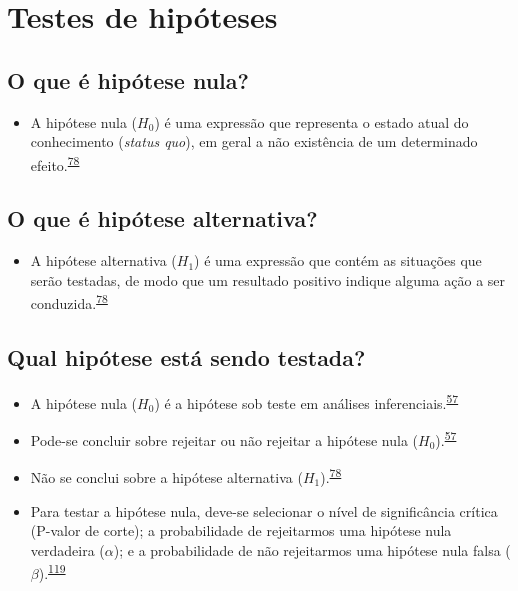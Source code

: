 \documentclass[
  a4paper,
]{book}
\providecommand{\tightlist}{%
  \setlength{\itemsep}{0pt}\setlength{\parskip}{0pt}}
\begin{document}
\hypertarget{erros-inferencia}{%
\section{Testes de hipóteses}\label{erros-inferencia}}

\hypertarget{o-que-uxe9-hipuxf3tese-nula}{%
\subsection{O que é hipótese nula?}\label{o-que-uxe9-hipuxf3tese-nula}}

\begin{itemize}
\tightlist
\item
  A hipótese nula (\(H_{0}\)) é uma expressão que representa o estado atual do conhecimento (\emph{status quo}), em geral a não existência de um determinado efeito.\textsuperscript{\protect\hyperlink{ref-kanji2006}{78}}
\end{itemize}

\hypertarget{o-que-uxe9-hipuxf3tese-alternativa}{%
\subsection{O que é hipótese alternativa?}\label{o-que-uxe9-hipuxf3tese-alternativa}}

\begin{itemize}
\tightlist
\item
  A hipótese alternativa (\(H_{1}\)) é uma expressão que contém as situações que serão testadas, de modo que um resultado positivo indique alguma ação a ser conduzida.\textsuperscript{\protect\hyperlink{ref-kanji2006}{78}}
\end{itemize}

\hypertarget{qual-hipuxf3tese-estuxe1-sendo-testada}{%
\subsection{Qual hipótese está sendo testada?}\label{qual-hipuxf3tese-estuxe1-sendo-testada}}

\begin{itemize}
\item
  A hipótese nula (\(H_{0}\)) é a hipótese sob teste em análises inferenciais.\textsuperscript{\protect\hyperlink{ref-Ali2016}{57}}
\item
  Pode-se concluir sobre rejeitar ou não rejeitar a hipótese nula (\(H_{0}\)).\textsuperscript{\protect\hyperlink{ref-Ali2016}{57}}
\item
  Não se conclui sobre a hipótese alternativa (\(H_{1}\)).\textsuperscript{\protect\hyperlink{ref-kanji2006}{78}}
\item
  Para testar a hipótese nula, deve-se selecionar o nível de significância crítica (P-valor de corte); a probabilidade de rejeitarmos uma hipótese nula verdadeira (\(\alpha\)); e a probabilidade de não rejeitarmos uma hipótese nula falsa (\(\beta\)).\textsuperscript{\protect\hyperlink{ref-Curran-Everett2009}{119}}
\end{itemize}
\end{document}
